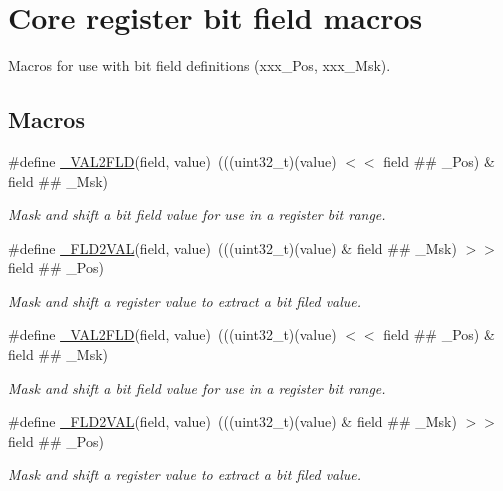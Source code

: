 \hypertarget{group___c_m_s_i_s__core__bitfield}{}\section{Core register bit field macros}
\label{group___c_m_s_i_s__core__bitfield}


Macros for use with bit field definitions (xxx\+\_\+\+Pos, xxx\+\_\+\+Msk).  


\subsection*{Macros}
\begin{DoxyCompactItemize}
\item 
\#define \hyperlink{group___c_m_s_i_s__core__bitfield_ga286e3b913dbd236c7f48ea70c8821f4e}{\+\_\+\+V\+A\+L2\+F\+LD}(field,  value)~(((uint32\+\_\+t)(value) $<$$<$ field \#\# \+\_\+\+Pos) \& field \#\# \+\_\+\+Msk)
\begin{DoxyCompactList}\small\item\em Mask and shift a bit field value for use in a register bit range. \end{DoxyCompactList}\item 
\#define \hyperlink{group___c_m_s_i_s__core__bitfield_ga139b6e261c981f014f386927ca4a8444}{\+\_\+\+F\+L\+D2\+V\+AL}(field,  value)~(((uint32\+\_\+t)(value) \& field \#\# \+\_\+\+Msk) $>$$>$ field \#\# \+\_\+\+Pos)
\begin{DoxyCompactList}\small\item\em Mask and shift a register value to extract a bit filed value. \end{DoxyCompactList}\item 
\#define \hyperlink{group___c_m_s_i_s__core__bitfield_ga286e3b913dbd236c7f48ea70c8821f4e}{\+\_\+\+V\+A\+L2\+F\+LD}(field,  value)~(((uint32\+\_\+t)(value) $<$$<$ field \#\# \+\_\+\+Pos) \& field \#\# \+\_\+\+Msk)
\begin{DoxyCompactList}\small\item\em Mask and shift a bit field value for use in a register bit range. \end{DoxyCompactList}\item 
\#define \hyperlink{group___c_m_s_i_s__core__bitfield_ga139b6e261c981f014f386927ca4a8444}{\+\_\+\+F\+L\+D2\+V\+AL}(field,  value)~(((uint32\+\_\+t)(value) \& field \#\# \+\_\+\+Msk) $>$$>$ field \#\# \+\_\+\+Pos)
\begin{DoxyCompactList}\small\item\em Mask and shift a register value to extract a bit filed value. \end{DoxyCompactList}\item 

\end{DoxyCompactItemize}
